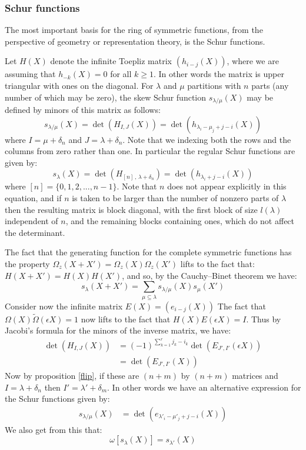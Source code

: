 \documentclass[12pt,dvips]{amsart}
\begin{document}
\subsubsection{Schur functions}\label{schurfun}
The most important basis for the ring of symmetric functions, from the perspective of geometry or representation theory,  is the Schur functions.
 
Let $H(X)$ denote the infinite Toepliz matrix $(h_{i-j}(X))$, where we are assuming that $h_{-k}(X) = 0 $ for all $k \geq 1$. In other words the matrix is upper triangular with ones on the diagonal. For $\lambda$ and $\mu$ partitions with $n$ parts (any number of which may be zero), the skew Schur function $s_{\lambda / \mu}(X)$ may be defined by minors of this matrix as follows:
$$ s_{\lambda / \mu}(X) = \det(H_{I,J}(X)) = \det(h_{\lambda_i - \mu_j + j - i}(X))$$
where $I = \mu + \delta_{n}$
and $J = \lambda + \delta_{n}$. Note that we indexing both the rows and the columns from zero rather than one. In particular the regular Schur functions are given by:
$$ s_\lambda(X) = \det(H_{[n] \, , \, \lambda + \delta_n}) = \det(h_{\lambda_i + j - i}(X)) $$
where $[n] = \{0,1,2,...,n-1\}$. Note that $n$ does not appear explicitly in this equation, and if $n$ is taken to be larger than the number of nonzero parts of $\lambda$ then the resulting matrix is block diagonal, with the first block of size $l(\lambda)$ independent of $n$, and the remaining blocks containing ones, which do not affect the determinant.

The fact that the generating function for the complete symmetric functions has the property
$ \Omega_z(X + X') = \Omega_z(X) \Omega_z(X') $
lifts to the fact that:
$ H(X + X') = H(X)H(X') $,
and so, by the Cauchy--Binet theorem we have:
$$ s_\lambda(X + X') = \sum_{\mu \subseteq \lambda} s_{\lambda / \mu}(X) s_\mu(X') $$
Consider now the infinite matrix $E(X) = (e_{i-j}(X))$
The fact that $ \Omega(X)\tilde{\Omega}(\epsilon X)  = 1 $ now lifts to the fact that $H(X)E( \epsilon X) = I$. Thus by Jacobi's formula for the minors of the inverse matrix, we have:
\begin{align*}
\det(H_{I,J}(X)) & =  (-1)^{\sum_{k=1}^r j_k - i_k} \det(E_{J',I'}(\epsilon X)) \\
& =  \det(E_{J',I'}(X))
\end{align*}
Now by proposition \ref{flip}, if these are $(n+m)$ by $(n+m)$ matrices and $I = \lambda + \delta_n$ then $I' = \lambda' + \delta_m$. In other words we have an alternative expression for the Schur functions given by:
\begin{align*}
s_{\lambda / \mu}(X) %
& =  \det( e_{\lambda'_i - \mu'_j + j - i}(X))
\end{align*}
We also get from this that:
$$ \omega[s_\lambda(X)] = s_{\lambda'}(X) $$
\end{document}
